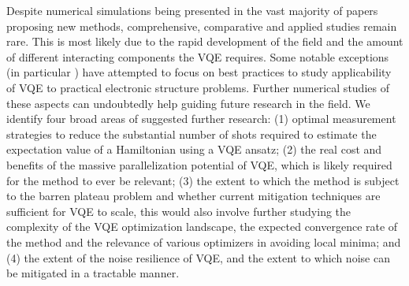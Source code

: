 \documentclass[a4paper,fleqn]{cas-sc}
\begin{document}
Despite numerical simulations being presented in the vast majority of papers proposing new methods, comprehensive, comparative and applied studies remain rare. This is most likely due to the rapid development of the field and the amount of different interacting components the VQE requires. Some notable exceptions (in particular \cite{Gonthier2020}) have attempted to focus on best practices to study applicability of VQE to practical electronic structure problems. Further numerical studies of these aspects can undoubtedly help guiding future research in the field. We identify four broad areas of suggested further research: (1) optimal measurement strategies to reduce the substantial number of shots required to estimate the expectation value of a Hamiltonian using a VQE ansatz; (2) the real cost and benefits of the massive parallelization potential of VQE, which is likely required for the method to ever be relevant; (3) the extent to which the method is subject to the barren plateau problem and whether current mitigation techniques are sufficient for VQE to scale, this would also involve further studying the complexity of the VQE optimization landscape, the expected convergence rate of the method and the relevance of various optimizers in avoiding local minima; and (4) the extent of the noise resilience of VQE, and the extent to which noise can be mitigated in a tractable manner. 
\end{document}
